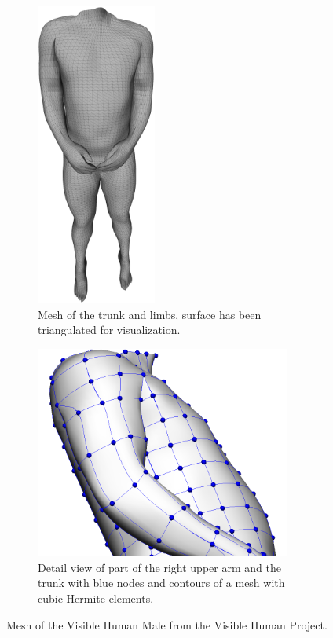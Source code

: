 \begin{figure}%
  \centering%
  \begin{subfigure}[t]{0.48\textwidth}%
    \centering%
    \includegraphics[height=10cm]{images/fiber_creation/skin00.png}%
    \caption{Mesh of the trunk and limbs, surface has been triangulated for visualization.}%
    \label{fig:vhp_total}%
  \end{subfigure}
  \quad
  \begin{subfigure}[t]{0.48\textwidth}%
    \centering%
    \includegraphics[height=7cm]{images/fiber_creation/elements4.png}%
    \caption{Detail view of part of the right upper arm and the trunk with blue nodes and contours of a mesh with cubic Hermite elements.}%
    \label{fig:vhp_detail}%
  \end{subfigure} 
  \caption{Mesh of the Visible Human Male from the Visible Human Project.}%
  \label{fig:vhp_geometry}%
\end{figure}%

